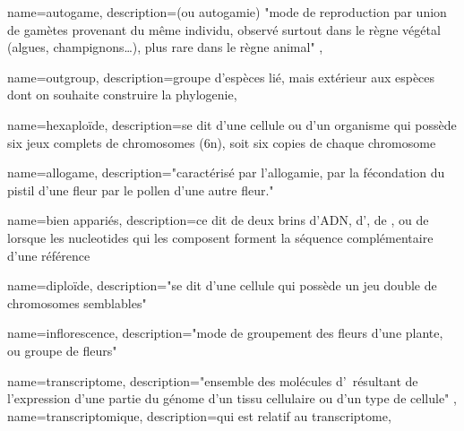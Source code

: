 




 {
    name={autogame},
    description={(ou autogamie) "mode de reproduction par union de gamètes provenant du même individu, observé surtout dans le règne végétal (algues, champignons…), plus rare dans le règne animal" \cite{Robert}},
}

 {
    name={outgroup},
    description={groupe d'espèces lié, mais extérieur aux espèces dont on souhaite construire la \gls{phylogenie}},
}

% 
 {
    name={hexaploïde},
    description={se dit d'une cellule ou d'un organisme qui possède six jeux complets de chromosomes (6n), soit six copies de chaque chromosome}
}
 
 {
    name={allogame},
    description={"caractérisé par l'allogamie, par la fécondation du pistil d'une fleur par le pollen d'une autre fleur." \cite{Robert}}
}

 {
    name={bien appariés},
    description={ce dit de deux brins d'ADN, d'\ARN, de \reads, ou de \contigs lorsque les \glspl{nucleotide} qui les composent forment la séquence complémentaire d'une référence}
}


 {
    name=diploïde,
    description={"se dit d'une cellule qui possède un jeu double de chromosomes semblables" \cite{Robert}}
}

 {
    name=inflorescence,
    description={"mode de groupement des fleurs d'une plante, ou groupe de fleurs" \cite{LeDico}}
}

 {
    name=transcriptome,
    description={"ensemble des molécules d'\ARN résultant de l'expression d'une partie du génome d'un tissu cellulaire ou d'un type de cellule" \cite{LeDico}},
}
 {
    name=transcriptomique,
    description={qui est relatif au \gls{transcriptome}},
}

